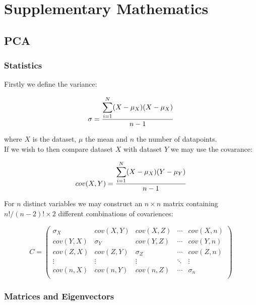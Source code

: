 

   \chapter{Supplementary Mathematics}

  \section{PCA} \label{appendix:pca}
  \subsection{Statistics}

  Firstly we define the variance:

  \begin{equation}
      \sigma = \frac{ \mathlarger{\sum}_{i=1}^{N} (X-\mu_X)(X-\mu_X)}{n-1}
  \end{equation}

  where $X$ is the dataset, $\mu$ the mean and $n$ the number of datapoints.\\

  If we wish to then compare dataset $X$ with dataset $Y$ we may use the covarance:

  \begin{equation}
      cov(X,Y) = \frac{ \mathlarger{\sum}_{i=1}^{N} (X-\mu_X)(Y-\mu_Y)}{n-1}
  \end{equation}

  For $n$ distinct variables we may construct an $n \times n$ matrix containing $n!/(n-2)!\times 2$ different combinations of covariences:



  \[
  C=
    \begin{pmatrix}
      \sigma_X & cov(X,Y) & cov(X,Z)& \cdots & cov(X,n) \\
      cov(Y,X) & \sigma_Y & cov(Y,Z)& \cdots & cov(Y,n) \\
      cov(Z,X)& cov(Z,Y) & \sigma_Z& \cdots & cov(Z,n) \\
      \vdots & \vdots & \vdots & \ddots & \vdots \\
      cov(n,X) & cov(n,Y) & cov(n,Z)& \cdots & \sigma_n \\
    \end{pmatrix}
  \]

  \subsection{Matrices and Eigenvectors}

